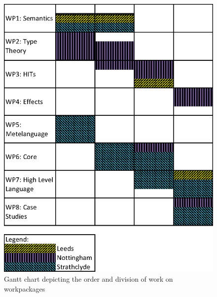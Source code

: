 \documentclass[a4paper,11pt]{article}
\begin{document}



\newpage
\begin{figure}
\centering
\includegraphics{Gantt.eps}
\caption{Gantt chart depicting the order and division of work on workpackages}
\end{figure}
\newpage

\begin{footnotesize}
\begin{twocolumn}

%
%

\end{twocolumn}
\end{footnotesize}

% 
% 
\end{document}
